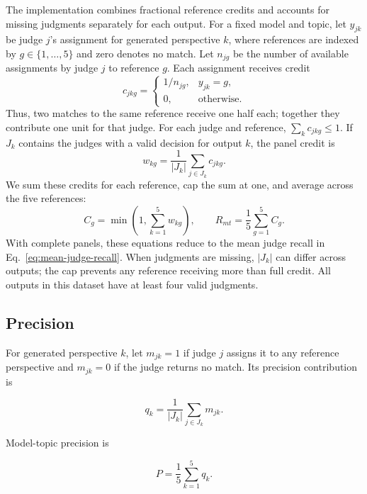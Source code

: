 \documentclass[11pt,a4paper]{article}
\begin{document}
The implementation combines fractional reference credits and accounts for missing judgments separately for each output. For a fixed model and topic, let $y_{jk}$ be judge $j$'s assignment for generated perspective $k$, where references are indexed by $g\in\{1,\ldots,5\}$ and zero denotes no match. Let $n_{jg}$ be the number of available assignments by judge $j$ to reference $g$. Each assignment receives credit
\begin{equation}
c_{jkg}=\begin{cases}
1/n_{jg}, & y_{jk}=g,\\
0, & \text{otherwise}.
\end{cases}
\label{eq:split-credit}
\end{equation}
Thus, two matches to the same reference receive one half each; together they contribute one unit for that judge. For each judge and reference, $\sum_k c_{jkg}\leq 1$. If $J_k$ contains the judges with a valid decision for output $k$, the panel credit is
\begin{equation}
w_{kg}=\frac{1}{|J_k|}\sum_{j\in J_k}c_{jkg}.
\label{eq:panel-credit}
\end{equation}
We sum these credits for each reference, cap the sum at one, and average across the five references:
\begin{equation}
C_g=\min\!\left(1,\sum_{k=1}^{5}w_{kg}\right),
\qquad
R_{mt}=\frac{1}{5}\sum_{g=1}^{5}C_g.
\label{eq:topic-recall}
\end{equation}
With complete panels, these equations reduce to the mean judge recall in Eq.~\ref{eq:mean-judge-recall}. When judgments are missing, $|J_k|$ can differ across outputs; the cap prevents any reference receiving more than full credit. All outputs in this dataset have at least four valid judgments.


\subsection{Precision}
\label{app:precision_aggregation}

For generated perspective $k$, let $m_{jk}=1$ if judge $j$ assigns it to any reference perspective and $m_{jk}=0$ if the judge returns no match. Its precision contribution is

\begin{equation}
 q_k=\frac{1}{|J_k|}\sum_{j\in J_k}m_{jk}.
\end{equation}

Model-topic precision is

\begin{equation}
 P=\frac{1}{5}\sum_{k=1}^{5}q_k.
\end{equation}
\end{document}
